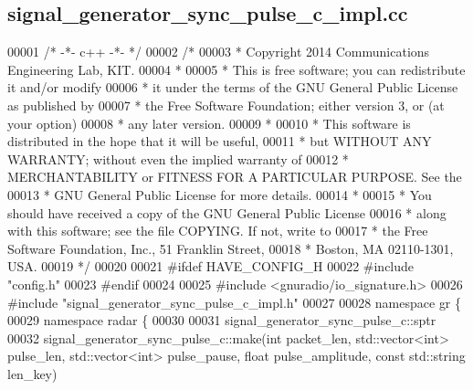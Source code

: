 \subsection{signal\+\_\+generator\+\_\+sync\+\_\+pulse\+\_\+c\+\_\+impl.\+cc}
\label{signal__generator__sync__pulse__c__impl_8cc_source}

\begin{DoxyCode}
00001 \textcolor{comment}{/* -*- c++ -*- */}
00002 \textcolor{comment}{/* }
00003 \textcolor{comment}{ * Copyright 2014 Communications Engineering Lab, KIT.}
00004 \textcolor{comment}{ * }
00005 \textcolor{comment}{ * This is free software; you can redistribute it and/or modify}
00006 \textcolor{comment}{ * it under the terms of the GNU General Public License as published by}
00007 \textcolor{comment}{ * the Free Software Foundation; either version 3, or (at your option)}
00008 \textcolor{comment}{ * any later version.}
00009 \textcolor{comment}{ * }
00010 \textcolor{comment}{ * This software is distributed in the hope that it will be useful,}
00011 \textcolor{comment}{ * but WITHOUT ANY WARRANTY; without even the implied warranty of}
00012 \textcolor{comment}{ * MERCHANTABILITY or FITNESS FOR A PARTICULAR PURPOSE.  See the}
00013 \textcolor{comment}{ * GNU General Public License for more details.}
00014 \textcolor{comment}{ * }
00015 \textcolor{comment}{ * You should have received a copy of the GNU General Public License}
00016 \textcolor{comment}{ * along with this software; see the file COPYING.  If not, write to}
00017 \textcolor{comment}{ * the Free Software Foundation, Inc., 51 Franklin Street,}
00018 \textcolor{comment}{ * Boston, MA 02110-1301, USA.}
00019 \textcolor{comment}{ */}
00020 
00021 \textcolor{preprocessor}{#ifdef HAVE\_CONFIG\_H}
00022 \textcolor{preprocessor}{#include "config.h"}
00023 \textcolor{preprocessor}{#endif}
00024 
00025 \textcolor{preprocessor}{#include <gnuradio/io\_signature.h>}
00026 \textcolor{preprocessor}{#include "signal_generator_sync_pulse_c_impl.h"}
00027 
00028 \textcolor{keyword}{namespace }gr \{
00029   \textcolor{keyword}{namespace }radar \{
00030 
00031     signal_generator_sync_pulse_c::sptr
00032     signal_generator_sync_pulse_c::make(\textcolor{keywordtype}{int} packet\_len, std::vector<int> pulse\_len, std::vector<int> 
      pulse\_pause, \textcolor{keywordtype}{float} pulse\_amplitude, \textcolor{keyword}{const} std::string len\_key)

\end{DoxyCode}
